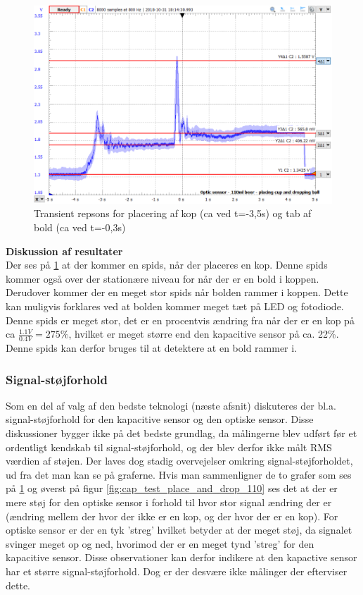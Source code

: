 \documentclass[HardwareDesign/HardwareDesign_main.tex]{subfiles}
\begin{document}
\begin{figure}[H]
    \centering
    \includegraphics[width=\textwidth]{HardwareDesign/CupSensor/graphics/OpticTest/placingCupAndDroppingBall(110ml-beer).png}
    \caption{Transient repsons for placering af kop (ca ved t=-3,5s)  og tab af bold (ca ved t=-0,3s)}
    \label{fig:optic_place_and_drop_110ml}
\end{figure}


\textbf{Diskussion af resultater}\\
Der ses på \ref{fig:optic_place_and_drop_110ml} at der kommer en spids, når der placeres en kop. Denne spids kommer også over der stationære niveau for når der er en bold i koppen. Derudover kommer der en meget stor spids når bolden rammer i koppen. Dette kan muligvis forklares ved at bolden kommer meget tæt på LED og fotodiode. Denne spids er meget stor, det er en procentvis ændring fra når der er en kop på ca $\frac{1.1\si{V}}{0.4\si{V}} = 275\%$, hvilket er meget større end den kapacitive sensor på ca. 22\%. Denne spids kan derfor bruges til at detektere at en bold rammer i. 

\subsubsection{Signal-støjforhold}
Som en del af valg af den bedste teknologi (næste afsnit) diskuteres der bl.a. signal-støjforhold for den kapacitive sensor og den optiske sensor. Disse diskussioner bygger ikke på det bedste grundlag, da målingerne blev udført før et ordentligt kendskab til signal-støjforhold, og der blev derfor ikke målt RMS værdien af støjen. Der laves dog stadig overvejelser omkring signal-støjforholdet, ud fra det man kan se på graferne. Hvis man sammenligner de to grafer som ses på \ref{fig:optic_place_and_drop_110ml} og øverst på figur \ref{fig:cap_test_place_and_drop_110} ses det at der er mere støj for den optiske sensor i forhold til hvor stor signal ændring der er (ændring mellem der hvor der ikke er en kop, og der hvor der er en kop). For optiske sensor er der en tyk 'streg' hvilket betyder at der meget støj, da signalet svinger meget op og ned, hvorimod der er en meget tynd 'streg' for den kapacitive sensor. Disse observationer kan derfor indikere at den kapactive sensor har et større signal-støjforhold. Dog er der desvære ikke målinger der efterviser dette.
\end{document}
